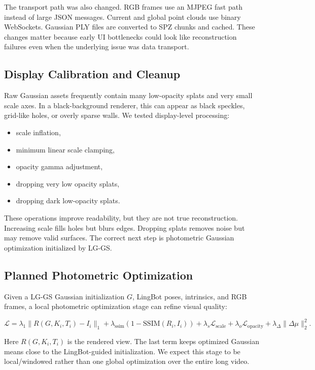 \documentclass[11pt]{article}
\newcommand{\methodabbr}{LG-GS}
\newcommand{\RouteB}{\methodabbr\xspace}
\begin{document}
The transport path was also changed. RGB frames use an MJPEG fast path instead of large JSON messages. Current and global point clouds use binary WebSockets. Gaussian PLY files are converted to SPZ chunks and cached. These changes matter because early UI bottlenecks could look like reconstruction failures even when the underlying issue was data transport.

\subsection{Display Calibration and Cleanup}

Raw Gaussian assets frequently contain many low-opacity splats and very small scale axes. In a black-background renderer, this can appear as black speckles, grid-like holes, or overly sparse walls. We tested display-level processing:

\begin{itemize}
    \item scale inflation,
    \item minimum linear scale clamping,
    \item opacity gamma adjustment,
    \item dropping very low opacity splats,
    \item dropping dark low-opacity splats.
\end{itemize}

These operations improve readability, but they are not true reconstruction. Increasing scale fills holes but blurs edges. Dropping splats removes noise but may remove valid surfaces. The correct next step is photometric Gaussian optimization initialized by \RouteB.

\subsection{Planned Photometric Optimization}

Given a \RouteB Gaussian initialization \(G\), LingBot poses, intrinsics, and RGB frames, a local photometric optimization stage can refine visual quality:

\begin{equation}
\mathcal{L} =
\lambda_1 \| R(G,K_i,T_i) - I_i \|_1
+ \lambda_{\mathrm{ssim}}(1-\mathrm{SSIM}(R_i,I_i))
+ \lambda_s \mathcal{L}_{\mathrm{scale}}
+ \lambda_o \mathcal{L}_{\mathrm{opacity}}
+ \lambda_{\Delta}\|\Delta\mu\|_2^2.
\end{equation}

Here \(R(G,K_i,T_i)\) is the rendered view. The last term keeps optimized Gaussian means close to the LingBot-guided initialization. We expect this stage to be local/windowed rather than one global optimization over the entire long video.
\end{document}
